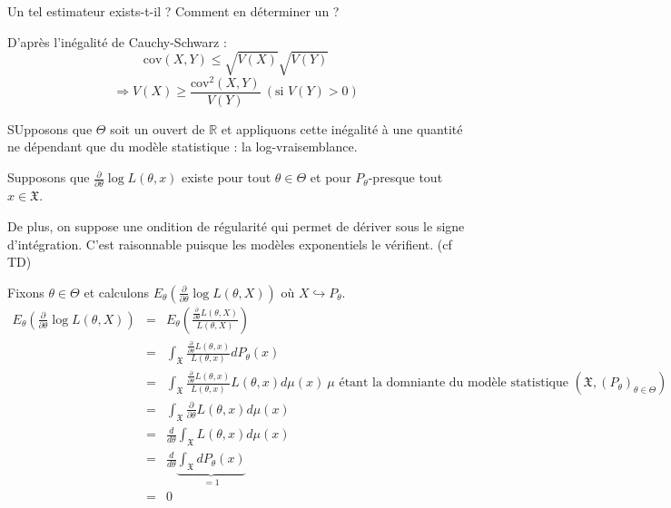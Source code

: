 Un tel estimateur exists-t-il ? Comment en déterminer un ?


D'après l'inégalité de Cauchy-Schwarz : 
\[\text{cov}(X,Y)\leq \sqrt{V(X)}\sqrt{V(Y)}\]
\[\Rightarrow V(X)\geq \frac{\text{cov}^2(X,Y)}{V(Y)}\ (\text{si } V(Y)>0)\]

SUpposons que $\Theta$ soit un ouvert de $\mathbb{R}$ et appliquons cette inégalité à une quantité ne dépendant que du modèle statistique : la log-vraisemblance.

\bigskip
Supposons que $\frac{\partial}{\partial\theta}\log L(\theta,x)$ existe pour tout $\theta\in\Theta$ et pour $P_{\theta}$-presque tout $x\in\mathfrak{X}$.

\bigskip
De plus, on suppose une ondition de régularité qui permet de dériver sous le signe d'intégration. C'est raisonnable puisque les modèles exponentiels le vérifient. (cf TD)

Fixons $\theta\in\Theta$ et calculons $E_{\theta}\left(\frac{\partial}{\partial\theta}\log L(\theta,X)\right)$ où $X\hookrightarrow P_{\theta}$.
\begin{eqnarray*}
	E_{\theta}\left(\frac{\partial}{\partial\theta}\log L(\theta,X)\right)&=&E_{\theta}\left(\frac{\frac{\partial}{\partial\theta}L(\theta,X)}{L(\theta,X)}\right)\\
	&=&\int_{\mathfrak{X}} \frac{\frac{\partial}{\partial\theta}L(\theta,x)}{L(\theta,x)} dP_{\theta}(x)\\
	&=&\int_{\mathfrak{X}} \frac{\frac{\partial}{\partial\theta}L(\theta,x)}{L(\theta,x)} L(\theta,x) d\mu(x)\ \mu \text{ étant la domniante du modèle statistique } (\mathfrak{X}, (P_{\theta})_{\theta\in\Theta})\\
	&=& \int_{\mathfrak{X}} \frac{\partial}{\partial\theta} L(\theta,x) d\mu(x) \\
	&=& \frac{d}{d\theta} \int_{\mathfrak{X}} L(\theta,x)d\mu(x)\\
	&=& \frac{d}{d\theta} \underbrace{\int_{\mathfrak{X}} dP_{\theta}(x)}_{=1}\\
	&=&0
\end{eqnarray*}

